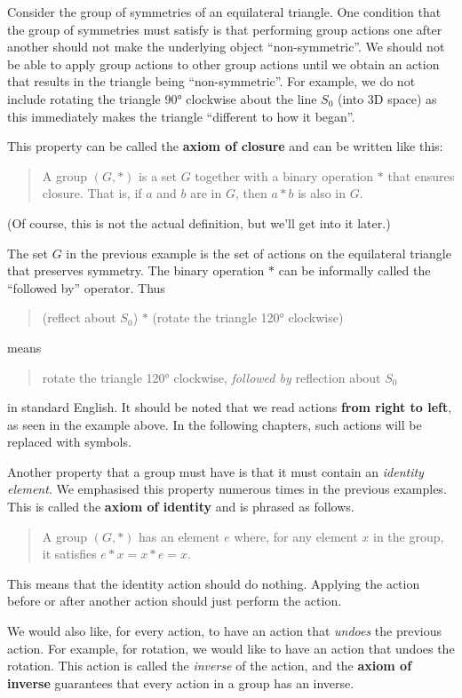 Consider the group of symmetries of an equilateral triangle. One condition that the group of symmetries must satisfy is that performing group actions one after another should not make the underlying object ``non-symmetric''. We should not be able to apply group actions to other group actions until we obtain an action that results in the triangle being ``non-symmetric''. For example, we do not include rotating the triangle 90° clockwise about the line $S_0$ (into 3D space) as this immediately makes the triangle ``different to how it began''.

This property can be called the \textbf{axiom of closure} and can be written like this:
\begin{quote}
    A group $(G, \ast)$ is a set $G$ together with a binary operation $\ast$ that ensures closure. That is, if $a$ and $b$ are in $G$, then $a \ast b$ is also in $G$.
\end{quote}
(Of course, this is not the actual definition, but we'll get into it later.)

\newpage

The set $G$ in the previous example is the set of actions on the equilateral triangle that preserves symmetry. The binary operation $\ast$ can be informally called the ``followed by'' operator. Thus
\begin{quote}
    (reflect about $S_0$) $\ast$ (rotate the triangle 120° clockwise)
\end{quote}
means
\begin{quote}
    rotate the triangle 120° clockwise, \textit{followed by} reflection about $S_0$
\end{quote}
in standard English. It should be noted that we read actions \textbf{from right to left}, as seen in the example above. In the following chapters, such actions will be replaced with symbols.

Another property that a group must have is that it must contain an \textit{identity element}. We emphasised this property numerous times in the previous examples. This is called the \textbf{axiom of identity} and is phrased as follows.
\begin{quote}
    A group $(G, \ast)$ has an element $e$ where, for any element $x$ in the group, it satisfies $e \ast x = x \ast e = x$.
\end{quote}
This means that the identity action should do nothing. Applying the action before or after another action should just perform the action.

We would also like, for every action, to have an action that \textit{undoes} the previous action. For example, for rotation, we would like to have an action that undoes the rotation. This action is called the \textit{inverse} of the action, and the \textbf{axiom of inverse} guarantees that every action in a group has an inverse.

